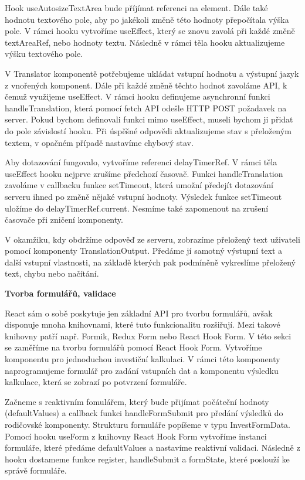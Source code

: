 Hook useAutosizeTextArea bude příjímat referenci na element. Dále také hodnotu textového pole, aby po jakékoli změně této hodnoty přepočítala výška pole. 
V rámci hooku vytvoříme useEffect, který se znovu zavolá při každé změně textAreaRef, nebo hodnoty textu. Následně v rámci těla hooku aktualizujeme výšku textového pole.

V Translator komponentě potřebujeme ukládat vstupní hodnotu a výstupní jazyk z vnořených komponent. Dále při každé změně těchto hodnot zavoláme API, k čemuž využijeme useEffect.
V rámci hooku definujeme asynchronní funkci handleTranslation, která pomocí fetch API odešle HTTP POST požadavek na server. 
Pokud bychom definovali funkci mimo useEffect, museli bychom ji přidat do pole závislostí hooku.
Při úspěšné odpovědi aktualizujeme stav s přeloženým textem, v opačném případě nastavíme chybový stav.

Aby dotazování fungovalo, vytvoříme referenci delayTimerRef. V rámci těla useEffect hooku nejprve zrušíme předchozí časovač. 
Funkci handleTranslation zavoláme v callbacku funkce setTimeout, která umožní předejít dotazování serveru ihned po změně nějaké vstupní hodnoty. 
Výsledek funkce setTimeout uložíme do delayTimerRef.current. Nesmíme také zapomenout na zrušení časovače při zničení komponenty.

V okamžiku, kdy obdržíme odpověď ze serveru, zobrazíme přeložený text uživateli pomocí komponenty TranslationOutput. 
Předáme jí samotný výstupní text a další vstupní vlastnosti, na základě kterých pak podmíněně vykreslíme přeložený text, chybu nebo načítání.

\begin{flushleft}
  \textbf{Tvorba formulářů, validace}
\end{flushleft}

React sám o sobě poskytuje jen základní API pro tvorbu formulářů, avšak disponuje mnoha knihovnami, které tuto funkcionalitu rozšiřují. 
Mezi takové knihovny patří např. Formik, Redux Form nebo React Hook Form. V této sekci se zaměříme na tvorbu formulářů pomocí React Hook Form. 
Vytvoříme komponentu pro jednoduchou investiční kalkulaci. 
V rámci této komponenty naprogramujeme formulář pro zadání vstupních dat a komponentu výsledku kalkulace, která se zobrazí po potvrzení formuláře.

Začneme s reaktivním fomulářem, který bude přijímat počáteční hodnoty (defaultValues) a callback funkci handleFormSubmit pro předání výsledků do rodičovské komponenty. 
Strukturu formuláře popíšeme v typu InvestFormData. Pomocí hooku useForm z knihovny React Hook Form vytvoříme instanci formuláře, které předáme defaultValues a nastavíme reaktivní validaci. 
Následně z hooku dostameme funkce register, handleSubmit a formState, které poslouží ke správě formuláře.

